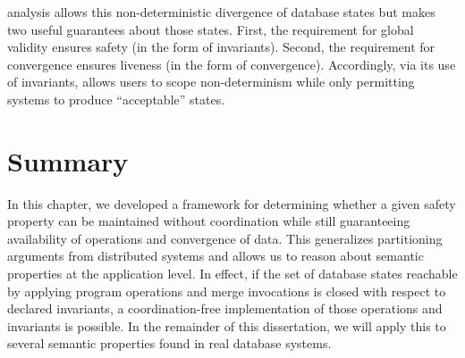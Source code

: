 \Iconfluence analysis allows this non-deterministic divergence of
database states but makes two useful guarantees about those
states. First, the requirement for global validity ensures safety (in
the form of invariants). Second, the requirement for convergence
ensures liveness (in the form of convergence). Accordingly, via its
use of invariants, \iconfluence allows users to scope non-determinism
while only permitting systems to produce ``acceptable'' states.

\section{Summary}

In this chapter, we developed a framework for determining whether a
given safety property can be maintained without coordination while
still guaranteeing availability of operations and convergence of
data. This \iconfluence generalizes partitioning arguments from
distributed systems and allows us to reason about semantic properties
at the application level. In effect, if the set of database states
reachable by applying program operations and merge invocations is
closed with respect to declared invariants, a coordination-free
implementation of those operations and invariants is possible. In the
remainder of this dissertation, we will
apply this \iconfluence to several semantic properties found in real
database systems.
